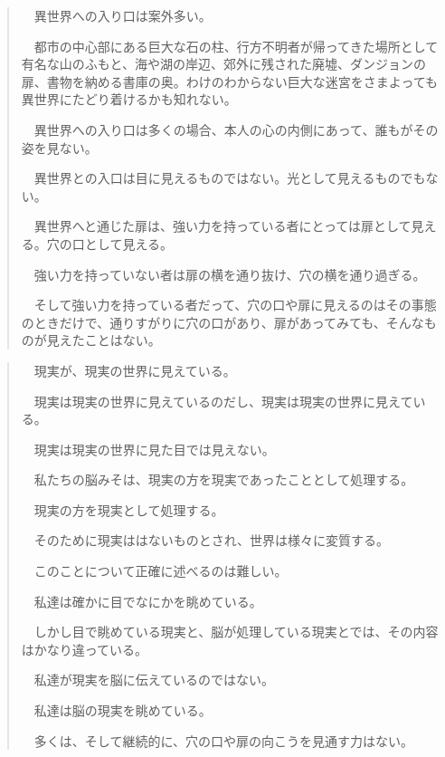 \documentclass[10pt, a5paper, twoside]{jsarticle}
\theoremstyle{definition}
\begin{document}
		\begin{quote}
			　異世界への入り口は案外多い。

			　都市の中心部にある巨大な石の柱、行方不明者が帰ってきた場所として有名な山のふもと、海や湖の岸辺、郊外に残された廃墟、ダンジョンの扉、書物を納める書庫の奥。わけのわからない巨大な迷宮をさまよっても異世界にたどり着けるかも知れない。

			　異世界への入り口は多くの場合、本人の心の内側にあって、誰もがその姿を見ない。

			　異世界との入口は目に見えるものではない。光として見えるものでもない。

			　異世界へと通じた扉は、強い力を持っている者にとっては扉として見える。穴の口として見える。

			　強い力を持っていない者は扉の横を通り抜け、穴の横を通り過ぎる。

			　そして強い力を持っている者だって、穴の口や扉に見えるのはその事態のときだけで、通りすがりに穴の口があり、扉があってみても、そんなものが見えたことはない。
		\end{quote}

		\begin{quote}
			　現実が、現実の世界に見えている。

			　現実は現実の世界に見えているのだし、現実は現実の世界に見えている。

			　現実は現実の世界に見た目では見えない。

			　私たちの脳みそは、現実の方を現実であったこととして処理する。

			　現実の方を現実として処理する。

			　そのために現実ははないものとされ、世界は様々に変質する。

			　このことについて正確に述べるのは難しい。

			　私達は確かに目でなにかを眺めている。

			　しかし目で眺めている現実と、脳が処理している現実とでは、その内容はかなり違っている。

			　私達が現実を脳に伝えているのではない。

			　私達は脳の現実を眺めている。

			　多くは、そして継続的に、穴の口や扉の向こうを見通す力はない。
		\end{quote}
\end{document}
